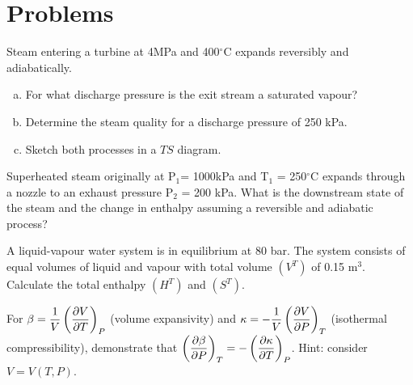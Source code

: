 \section{Problems}
\begin{MyTutorial}{}%
%
  \begin{problem}\label{Chapter:ThermodynamicPropertiesPureFluids:Problem:01} %
      Steam entering a turbine at 4MPa and 400$^{\circ}$C expands reversibly and adiabatically.
        \begin{enumerate}[a)]
           \item For what discharge pressure is the exit stream a saturated vapour?
           \item Determine the steam quality for a discharge pressure of 250 kPa.
           \item Sketch both processes in a $TS$ diagram.
        \end{enumerate}
  \end{problem}
%
  \begin{problem}\label{Chapter:ThermodynamicPropertiesPureFluids:Problem:02} %
     Superheated steam originally at P$_{1}$= 1000kPa and T$_{1}$ = 250$^{\circ}$C expands through a nozzle to an exhaust pressure P$_{2}$ =  200 kPa. What is the downstream state of the steam and the change in enthalpy assuming a reversible and adiabatic process?
  \end{problem}
%
  \begin{problem}\label{Chapter:ThermodynamicPropertiesPureFluids:Problem:03}\citep{SmithVanNess_Book}  %
     A liquid-vapour water system is in equilibrium at 80 bar. The system consists of equal volumes of liquid and vapour with total volume $\left(V^{T}\right)$ of 0.15 m$^{3}$. Calculate the total enthalpy $\left(H^{T}\right)$ and $\left(S^{T}\right)$. 
  \end{problem}
%
  \begin{problem}\label{Chapter:ThermodynamicPropertiesPureFluids:Problem:04} \citep{SmithVanNess_Book}
     For $\beta = \displaystyle\frac{1}{V}\left(\displaystyle\frac{\partial V}{\partial T}\right)_{P}$ (volume expansivity) and $\kappa = -\displaystyle\frac{1}{V}\left(\displaystyle\frac{\partial V}{\partial P}\right)_{T}$ (isothermal compressibility), demonstrate that $\left(\displaystyle\frac{\partial\beta}{\partial P}\right)_{T} = -\left(\displaystyle\frac{\partial\kappa}{\partial T}\right)_{P}$. Hint: consider $V=V\left(T,P\right)$.
  \end{problem}

\end{MyTutorial}
